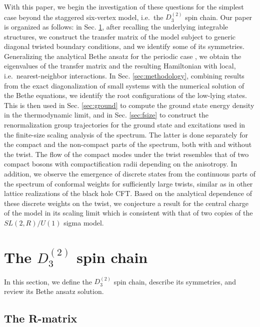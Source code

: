 \documentclass[12pt]{article}
\numberwithin{equation}{section}
\begin{document}
	With this paper, we begin the investigation of these questions for the simplest case beyond the staggered six-vertex model, i.e.\ the $D^{(2)}_3$ spin chain.  Our paper is organized as follows: in Sec. \ref{sec:basics}, after recalling the underlying integrable structures, we construct the transfer matrix of the model subject to generic diagonal twisted boundary conditions, and we identify some of its symmetries.  Generalizing the analytical Bethe ansatz for the periodic case \cite{Resh87}, we obtain the eigenvalues of the transfer matrix and the resulting Hamiltonian with local, i.e.\ nearest-neighbor interactions.  In Sec. \ref{sec:methodology}, combining results from the exact diagonalization of small systems with the numerical solution of the Bethe equations, we identify the root configurations of the low-lying states.  This is then used in Sec. \ref{sec:ground}
	to compute the ground state energy density in the thermodynamic limit, and in Sec. \ref{sec:fsize}
	to construct the renormalization group trajectories for the ground state and excitations used in the finite-size scaling analysis of the spectrum.  The latter is done separately for the compact and the non-compact parts of the spectrum, both with and without the twist.  The flow of the compact modes under the twist resembles that of two compact bosons with compactification radii depending on the anisotropy.  In addition, we observe the emergence of discrete states from  the continuous parts of the spectrum of conformal weights for sufficiently large twists, similar as in other lattice realizations of the black hole CFT. Based on the analytical dependence of these discrete weights on the twist, we conjecture a result for the central charge of the model in its scaling limit which is consistent with that of two copies of the $SL(2,R)/U(1)$ sigma model.
	
	
	\section{The \texorpdfstring{$D^{(2)}_3$}{D23} spin chain}\label{sec:basics}
	
	In this section, we define the $D^{(2)}_3$ spin chain, describe its symmetries, and review its Bethe ansatz solution.
	
	\subsection{The R-matrix}
	
\end{document}
